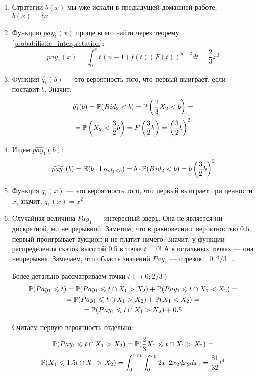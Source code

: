 \begin{enumerate}
\begin{enumerate}
\item Стратегии $ b(x) $ мы уже искали в предыдущей домашней работе, $ b(x)=\frac{2}{3}x $
\item Функцию $ pay_{1}(x) $ проще всего найти через теорему \ref{probabilistic_interpretation}:
\begin{equation}
pay_{1}(x)=\int_{0}^{x}t(n-1)f(t)(F(t))^{n-2}dt=\frac{2}{3}x^{3}
\end{equation}
\item Функция $ \widehat{q_{1}}(b) $ — это вероятность того, что первый выиграет, если поставит $ b $. Значит:
\begin{multline}
\widehat{q_{1}}(b)=\P(Bid_{2}<b)=\P\left(\frac{2}{3}X_{2}<b\right)=\\
=\P\left( X_{2}<\frac{3}{2}b\right)=F\left(\frac{3}{2}b\right)=\left(\frac{3}{2}b\right)^{2}
\end{multline}
\item Ищем $ \widehat{pay_{1}}(b) $:
\begin{equation}
\widehat{pay_{1}}(b)=\E(b\cdot 1_{Bid_{2}<b})=b\cdot \P(Bid_{2}<b)=b\left(\frac{3}{2}b\right)^{2}
\end{equation}
\item Функция $ q_{1}(x) $ — это вероятность того, что первый выиграет при ценности $ x $, значит, $ q_{1}(x)=x^{2} $
\item Cлучайная величина $ Pay_{1} $ — интересный зверь. Она не является ни дискретной, ни непрерывной. Заметим, что в равновесии с вероятностью $ 0.5 $ первый проигрывает аукцион и не платит ничего. Значит, у функции распределения скачок высотой 0.5 в точке $ t=0 $! А в остальных точках — она непрерывна. Замечаем, что область значений $ Pay_{1} $ — отрезок $ [0;2/3] $\ldots

Более детально рассматриваем точки $ t\in (0;2/3) $
\begin{multline}
\P(Pay_{1}\leq t)=\P(Pay_{1}\leq t \cap X_{1}>X_{2})+\P(Pay_{1}\leq t \cap X_{1}<X_{2})=\\
=\P(Pay_{1}\leq t \cap X_{1}>X_{2})+\P(X_{1}<X_{2})=\\
=\P(Pay_{1}\leq t \cap X_{1}>X_{2})+0.5
\end{multline}

Считаем первую вероятность отдельно:
\begin{multline}
\P(Pay_{1}\leq t \cap X_{1}>X_{2})=\P(\frac{2}{3}X_{1}\leq t \cap X_{1}>X_{2})=\\
\P(X_{1}\leq 1.5t \cap X_{1}>X_{2})=\int_{0}^{1.5t}\int_{0}^{x_{1}} 2x_{1}2x_{2}dx_{2}dx_{1}=\frac{81}{32}t^{4}
\end{multline}


\end{enumerate}
\end{enumerate}
